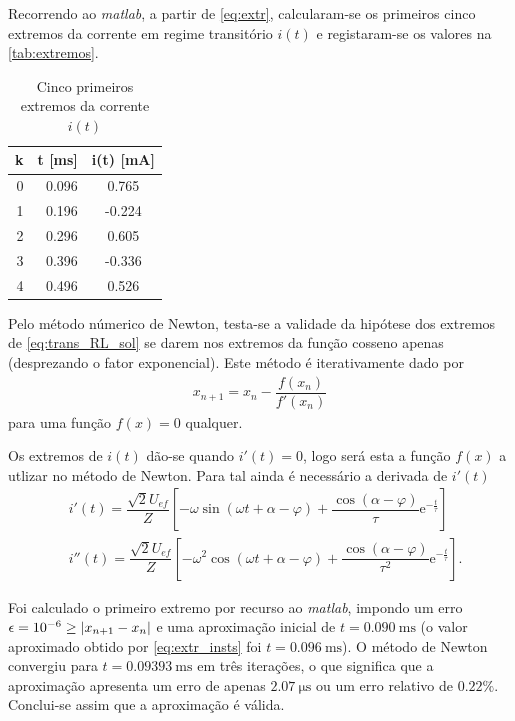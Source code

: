 \documentclass[a4paper, titlepage, portuguese]{article}
\newcommand\e{\mathrm{e} }
\begin{document}
	\subsubsection{}
	\par
	Recorrendo ao \textit{matlab}, a partir de \eqref{eq:extr}, calcularam-se os primeiros cinco extremos da corrente em regime transitório $i(t)$ e registaram-se os valores na \autoref{tab:extremos}.
	\begin{table}[H]
		\centering
		\caption{Cinco primeiros extremos da corrente $i(t)$}
		\label{tab:extremos}
		\begin{tabular}{| r | r | S |}
			\hline
			\textbf{k} & \textbf{t} [\si{\milli\second}] & \textbf{i(t)} [\si{\milli\ampere}] \\
			 & 0.096 & 0.765 \\
			1 & 0.196 & -0.224 \\
			2 & 0.296 & 0.605 \\
			3 & 0.396 & -0.336 \\
			4 & 0.496 & 0.526 \\
			\hline
		\end{tabular}
	\end{table}
	\par
	Pelo método númerico de Newton, testa-se a validade da hipótese dos extremos de \eqref{eq:trans_RL_sol} se darem nos extremos da função cosseno apenas (desprezando o fator exponencial). Este método é iterativamente dado por
	\begin{align*}
		x_{n+1} = x_n - \dfrac{f(x_n)}{f'(x_n)}
	\end{align*}
	para uma função $f(x) = 0$ qualquer.
	\par
	Os extremos de $i(t)$ dão-se quando $i'(t) = 0$, logo será esta a função $f(x)$ a utlizar no método de Newton. Para tal ainda é necessário a derivada de $i'(t)$
	\begin{align*}
		&i'(t) = \dfrac{\sqrt{2}U_{ef}}{Z} \left[-\omega \sin\left(\omega t + \alpha - \varphi\right) + \dfrac{\cos\left(\alpha - \varphi\right)}{\tau}\e^{-\frac{t}{\tau}}\right] \\
		&i''(t) = \dfrac{\sqrt{2}U_{ef}}{Z} \left[-\omega^2 \cos\left(\omega t + \alpha - \varphi\right) + \dfrac{\cos\left(\alpha - \varphi\right)}{\tau^2}\e^{-\frac{t}{\tau}}\right].
	\end{align*}
	\par
	Foi calculado o primeiro extremo por recurso ao \textit{matlab}, impondo um erro $\epsilon = \num{e-6} \geq \abs{x_{n+1} - x_n}$ e uma aproximação inicial de $t = \SI{0.090}{\milli\second}$ (o valor aproximado obtido por \eqref{eq:extr_insts} foi $t = \SI{0.096}{\milli\second}$). O método de Newton convergiu para $t = \SI{0.09393}{\milli\second}$ em três iterações, o que significa que a aproximação apresenta um erro de apenas $\SI{2.07}{\micro\second}$ ou um erro relativo de $0.22\%$. Conclui-se assim que a aproximação é válida.
\end{document}
